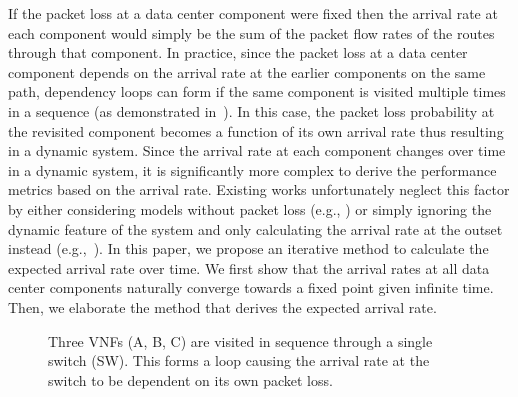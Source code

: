 If the packet loss at a data center component were fixed then the arrival rate at each component would simply be the sum of the packet flow rates of the routes through that component. In practice, since the packet loss at a data center component depends on the arrival rate at the earlier components on the same path, dependency loops can form if the same component is visited multiple times in a sequence (as demonstrated in~). In this case, the packet loss probability at the revisited component becomes a function of its own arrival rate thus resulting in a dynamic system. Since the arrival rate at each component changes over time in a dynamic system, it is significantly more complex to derive the performance metrics based on the arrival rate. Existing works unfortunately neglect this factor by either considering models without packet loss (e.g., \cite{ZhangXLLGW17,QuZYSLR20,AgarwalMCD18}) or simply ignoring the dynamic feature of the system and only calculating the arrival rate at the outset instead (e.g.,~\cite{ChuaWZSH16,MarottaZDK17}). In this paper, we propose an iterative method to calculate the expected arrival rate over time. We first show that the arrival rates at all data center components naturally converge towards a fixed point given infinite time. Then, we elaborate the method that derives the expected arrival rate.

\begin{figure}[t!]
	\centering
	\begin{minipage}{0.24\textwidth}
		\centering
		\vspace{.2em}
	\end{minipage}\hfill
	\vspace{2em}
	\begin{minipage}{0.24\textwidth}
		\centering
		\vspace{.2em}
	\end{minipage}

	\caption{Three VNFs (A, B, C) are visited in sequence through a single switch (SW). This forms a loop causing the arrival rate at the switch to be dependent on its own packet loss.}
	\label{fig:arrival_loop}
\end{figure}

